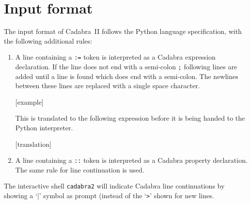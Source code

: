 \section{Input format}

The input format of Cadabra~II follows the Python language
specification, with the following additional rules:
\begin{enumerate}
\item A line containing a \verb|:=| token is interpreted as a Cadabra
  expression declaration. If the line does not end with a semi-colon
  \verb|;| following lines are added until a line is found which does
  end with a semi-colon. The newlines between these lines are replaced
  with a single space character.

  [example]

  This is translated to the following expression before it is being
  handed to the Python interpreter.

  [translation]

\item A line containing a \verb|::| token is interpreted as a Cadabra
  property declaration. The same rule for line continuation is used.
\end{enumerate}
The interactive shell \verb|cadabra2| will indicate Cadabra line
continuations by showing a `|' symbol as prompt (instead of the
`\verb|>|' shown for new lines.
